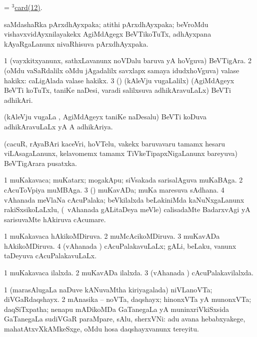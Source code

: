 \bentry 
{} 
\gl{\nA}
\expl{}
\bmng
 = \hyperref{kandict_c.pdf}{C}{card(3)12}{$^3$card(12)}.
\emng
\eentry

\bentry 
{}
\gl{\nA}
\expl{}
\bmng
 saMdashaRka pArxdhAyxpaka; atithi pArxdhAyxpaka; beVroMdu vishavxvidAyxnilayakekx AgiMdAgegx BeVTikoTuTx, adhAyxpana kAyaRgaLanunx nivaRhisuva pArxdhAyxpaka. 
\emng
\eentry

\bentry 
{} 
\gl{\nA}
\expl{}
\bmng
\bnum
\num{1} (vayxkitxyanunx, sathxLavanunx noVDalu baruva yA hoVguva) BeVTigAra. 
\num{2} (oMdu vaSaRdalilx oMdu jAgadalilx savxlapx samaya idudxhoVguva) valase hakikx:  caLigAlada valase hakikx. 
\num{3} (\birx) (kAleVju \mo vugaLalilx) (AgiMdAgeyx BeVTi koTuTx, taniKe naDesi, varadi salilxsuva adhikAravuLaLx) BeVTi adhikAri. 
\enum
\emng
\eentry
 
\bentry
{} 
\gl{\gu}
\expl{}
\bmng
 (kAleVju \mo vugaLa \vi, AgiMdAgeyx taniKe naDesalu) BeVTi koDuva adhikAravuLaLx yA A adhikAriya. 
\emng
\eentry

\bentry
{}
\gl{\nA}
\expl{}
\bmng
 (cacuR, rAyaBAri kaceVri, hoVTelu, \mo vakekx baruvavaru tamamx hesaru viLAsagaLanunx, kelavomemx tamamx TiVkeTipapxNigaLanunx bareyuva) BeVTigArara pusatxka. 
\emng
\eentry

\bentry 
{} 
\gl{\nA}
\expl{}
\bmng
\bnum
\num{1} muKakavaca; muKatarx; mogakApu; siVsakada sarisalAguva muKaBAga. 
\num{2} cAcuToVpiya muMBAga. 
\num{3} (\ca) muKavADa; muKa maresuva sAdhana. 
\num{4} vAhanada meVlaNa cAcuPalaka; beVkilalxda beLakiniMda kaNuNxgaLanunx rakiSxsikoLaLxlu, (\kanmu\ vAhanada gALitaDeya meVle) calisadaMte BadarxvAgi yA sarisuvaMte hAkiruva cAcumare. 
\enum
\emng
\eentry

\bentry 
{} 
\gl{\gu}
\expl{}
\bmng
\bnum
\num{1} muKakavaca hAkikoMDiruva. 
\num{2} muMcAcikoMDiruva. 
\num{3} muKavADa hAkikoMDiruva. 
\num{4} (vAhanada \vi) cAcuPalakavuLaLx; gALi, beLaku, \mo vanunx taDeyuva cAcuPalakavuLaLx. 
\enum
\emng
\eentry

\bentry
{} 
\gl{\gu}
\expl{}
\bmng
\bnum
\num{1} muKakavaca ilalxda. 
\num{2} muKavADa ilalxda. 
\num{3} (vAhanada \vi) cAcuPalakavilalxda. 
\enum
\emng
\eentry

\bentry 
{} 
\gl{\nA}
\expl{}
\bmng
\bnum
\num{1} (marasAlugaLa naDuve kANuvaMtha kiriyagalada) niVLanoVTa; diVGaRdaqshayx. 
\num{2} mAnasika -- noVTa, daqshayx; hinonxVTa yA munonxVTa; daqSiTxpatha; nenapu mADikoMDa GaTanegaLa yA muninxriVkiSxsida GaTanegaLa sudiVGaR paraMpare, sAlu, sherxVNi:  adu avana hebabxyakege, mahatAtxvXkAMkeSxge, oMdu hosa daqshayxvanunx tereyitu. 
\enum
\emng
\eentry

